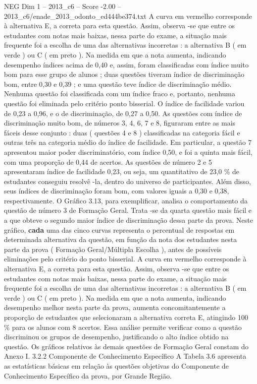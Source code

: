 \begin{textsample}{NEG Dim 1 – 2013\_c6 – Score -2.00 – 2013\_c6/enade\_2013\_odonto\_ed444be374.txt}
A curva em vermelho corresponde à alternativa E, a correta para esta questão.
Assim, observa -se que entre os estudantes com notas mais baixas, nessa parte do exame, a situação mais frequente foi a escolha de uma das alternativas incorretas : a alternativa B ( em verde ) ou C ( em preto ).
Na medida em que a nota aumenta, indicando desempenho índices acima de 0,40 e, assim, foram classificadas com índice muito bom para esse grupo de alunos ; duas questões tiveram índice de discriminação bom, entre 0,30 e 0,39 ; e uma questão teve índice de discriminação médio.
Nenhuma questão foi classificada com um índice fraco e, portanto, nenhuma questão foi eliminada pelo critério ponto bisserial.
O índice de facilidade variou de 0,23 a 0,96, e o de discriminação, de 0,27 a 0,50.
As questões com índice de discriminação muito bom, de números 3, 4, 6, 7 e 8, figuraram entre as mais fáceis desse conjunto : duas ( questões 4 e 8 ) classificadas na categoria fácil e outras três na categoria médio do índice de facilidade.
Em particular, a questão 7 apresentou maior poder discriminatório, com índice 0,50, e foi a quinta mais fácil, com uma proporção de 0,44 de acertos.
As questões de número 2 e 5 apresentaram índice de facilidade 0,23, ou seja, um quantitativo de 23,0 \% de estudantes conseguiu resolvê -la, dentro do universo de participantes.
Além disso, seus índices de discriminação foram bom, com valores iguais a 0,30 e 0,38, respectivamente.
O Gráfico 3.13, para exemplificar, analisa o comportamento da questão de número 3 de Formação Geral.
Trata -se da quarta questão mais fácil e a que obteve o segundo maior índice de discriminação dessa parte da prova.
Neste gráfico, \textbf{cada} uma das cinco curvas representa o percentual de respostas em determinada alternativa da questão, em função da nota dos estudantes nesta parte da prova ( Formação Geral/Múltipla Escolha ), antes de possíveis eliminações pelo critério do ponto bisserial.
A curva em vermelho corresponde à alternativa E, a correta para esta questão.
Assim, observa -se que entre os estudantes com notas mais baixas, nessa parte do exame, a situação mais frequente foi a escolha de uma das alternativas incorretas : a alternativa B ( em verde ) ou C ( em preto ).
Na medida em que a nota aumenta, indicando desempenho melhor nesta parte da prova, aumenta concomitantemente a proporção de estudantes que selecionaram a alternativa correta E, atingindo 100 \% para os alunos com 8 acertos.
Essa análise permite verificar como a questão discriminou os grupos de desempenho, justificando o alto índice obtido na questão.
Os gráficos relativos às demais questões de Formação Geral constam do Anexo I. 3.2.2 Componente de Conhecimento Específico A Tabela 3.6 apresenta as estatísticas básicas em relação às questões objetivas do Componente de Conhecimento Específico da prova, por Grande Região.

\end{textsample}
